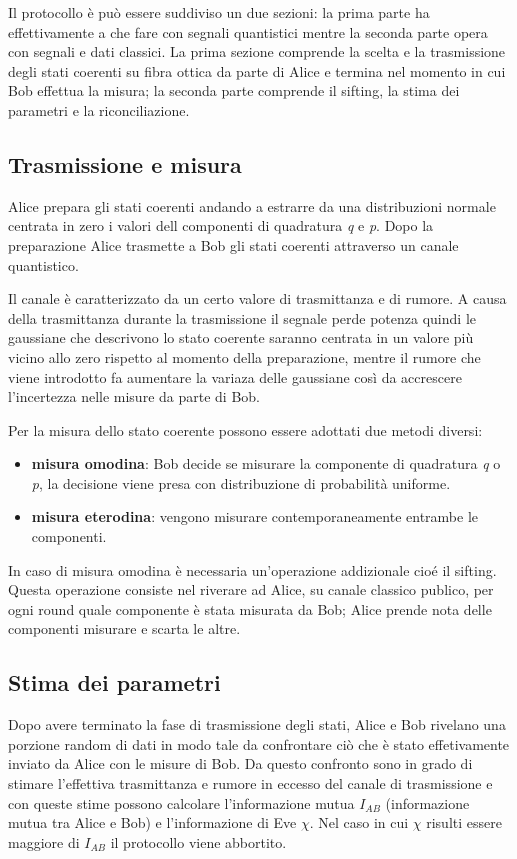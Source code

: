 Il protocollo \`e pu\`o essere suddiviso un due sezioni: la prima parte ha effettivamente a che fare con segnali quantistici mentre la seconda parte opera con segnali e dati classici. La prima sezione comprende la scelta e la trasmissione degli stati coerenti su fibra ottica da parte di Alice e termina nel momento in cui Bob effettua la misura; la seconda parte comprende il sifting, la stima dei parametri e la riconciliazione.

\subsection{Trasmissione e misura}
Alice prepara gli stati coerenti andando a estrarre da una distribuzioni normale centrata in zero i valori dell componenti di quadratura \textit{q} e \textit{p}. Dopo la preparazione Alice trasmette a Bob gli stati coerenti attraverso un canale quantistico.

Il canale \`e caratterizzato da un certo valore di trasmittanza e di rumore. A causa della trasmittanza durante la trasmissione il segnale perde potenza quindi le gaussiane che descrivono lo stato coerente saranno centrata in un valore pi\`u vicino allo zero rispetto al momento della preparazione, mentre il rumore che viene introdotto fa aumentare la variaza delle gaussiane cos\`i da accrescere l'incertezza nelle misure da parte di Bob.

Per la misura dello stato coerente possono essere adottati due metodi diversi:
\begin{itemize}
\item \textbf{misura omodina}: Bob decide se misurare la componente di quadratura \textit{q} o \textit{p}, la decisione viene presa con distribuzione di probabilit\`a uniforme.
\item \textbf{misura eterodina}: vengono misurare contemporaneamente entrambe le componenti.
\end{itemize}  

In caso di misura omodina \`e necessaria un'operazione addizionale cio\'e il sifting. Questa operazione consiste nel riverare ad Alice, su canale classico publico, per ogni round quale componente \`e stata misurata da Bob; Alice prende nota delle componenti misurare e scarta le altre.

\subsection{Stima dei parametri}\label{subse:stima-parametri}
Dopo avere terminato la fase di trasmissione degli stati, Alice e Bob rivelano una porzione random di dati in modo tale da confrontare ci\`o che \`e stato effetivamente inviato da Alice con le misure di Bob. Da questo confronto sono in grado di stimare l'effettiva trasmittanza e rumore in eccesso del canale di trasmissione e con queste stime possono calcolare l'informazione mutua $I_{AB}$ (informazione mutua tra Alice e Bob) e l'informazione di Eve $\chi$. Nel caso in cui $\chi$ risulti essere maggiore di $I_{AB}$ il protocollo viene abbortito.

